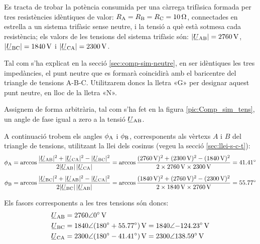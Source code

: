\begin{exemple}\label{ex:ImpedEquil}
	\addcontentsxms{\ImpedEquil}
    Es tracta de trobar la potència consumida per una càrrega trifàsica
    formada per tres resistències idèntiques de valor: $R_\mathrm{A}=R_\mathrm{B}=R_\mathrm{C}=\qty{10}{\ohm}$,
    connectades en estrella a un sistema trifàsic sense neutre, i la
    tensió a què està sotmesa cada resistència; els valors de les
    tensions del sistema trifàsic són: $|\cmplx{U}\ped{AB}| =
    \qty{2760}{V}$, $|\cmplx{U}\ped{BC}| = \qty{1840}{V}$ i
    $|\cmplx{U}\ped{CA}| = \qty{2300}{V}$.

    Tal com s'ha explicat en la secció \vref{sec:comp-sim-neutre}, en ser idèntiques les tres impedàncies, el punt neutre que es formarà coincidirà amb el baricentre del triangle de tensions A-B-C. Utilitzarem doncs la lletra «G» per designar aquest punt neutre, en lloc de la lletra «N».

    Assignem de forma arbitrària, tal com s'ha fet en la figura
    \vref{pic:Comp_sim_tens}, un angle de fase igual a zero a la tensió
    $\cmplx{U}\ped{AB}$.

    \begin{center}
        
    \end{center}

    A continuació trobem els angles $\phi_\mathrm{A}$ i $\phi_\mathrm{B}$,
    corresponents als vèrtexs  $A$ i $B$ del triangle de
    tensions, utilitzant la llei dels cosinus (vegeu la secció
    \vref{sec:llei-s-c-t}): 
    \begin{align*}
        \phi\ped{A} &= \arccos \frac{|\cmplx{U}\ped{AB}|^2 + |\cmplx{U}\ped{CA}|^2 -
        |\cmplx{U}\ped{BC}|^2}{2 |\cmplx{U}\ped{AB}| \,|\cmplx{U}\ped{CA}|} =
        \arccos \frac{(\qty{2760}{V})^2 + (\qty{2300}{V})^2 - (\qty{1840}{V})^2}{2 \times \qty{2760}{V}
        \times \qty{2300}{V}} = \ang{41,41} \\[1ex]
        \phi\ped{B} &= \arccos \frac{|\cmplx{U}\ped{BC}|^2 + |\cmplx{U}\ped{AB}|^2 -
        |\cmplx{U}\ped{CA}|^2}{2 |\cmplx{U}\ped{BC}| \,|\cmplx{U}\ped{AB}|} =
        \arccos \frac{(\qty{1840}{V})^2 + (\qty{2760}{V})^2 - (\qty{2300}{V})^2}{2 \times \qty{1840}{V}
        \times \qty{2760}{V}} = \ang{55,77}
    \end{align*}

    Els fasors corresponents a les tres tensions són doncs:
    \begin{align*}
    \cmplx{U}\ped{AB} &= \complexqty{2760:0}{V} \\
    \cmplx{U}\ped{BC} &= \num{1840}\angle(\ang{180} + \ang{55,77})\unit{\,V} =
    \complexqty{1840:-124,23}{V} \\
    \cmplx{U}\ped{CA} &= \num{2300}\angle(\ang{180} - \ang{41,41})\unit{\,V} = \complexqty{2300:138,59}{V} 
    \end{align*}


\end{exemple}
